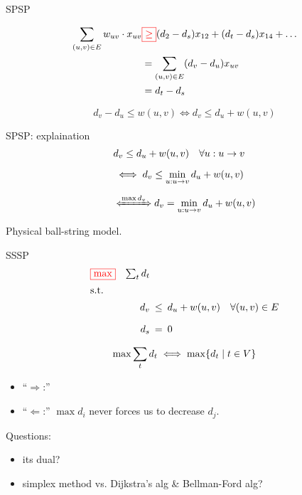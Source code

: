 \begin{frame}{SPSP}
  
  \begin{align*}
	\sum_{(u,v) \in E} w_{uv} \cdot x_{uv} & \textcolor{red}{\boxed{\geq}} (d_2 - d_s) x_{12} + (d_t - d_s) x_{14} + \dots	\\
	&	=	\sum_{(u,v) \in E} (d_v - d_u) x_{uv}	\\
	&	=	d_t - d_s
  \end{align*}

  \[
	d_v - d_u \leq w(u,v) \iff d_v \leq d_u + w(u,v)
  \]
\end{frame}
\begin{frame}{SPSP: explaination}
  \begin{align*}
	&	d_v \leq d_u + w(u,v)	\quad \forall u: u \to v	\\[6pt]
	& 	\iff	d_v \leq \min_{u: u \to v} d_u + w(u,v)	\\[6pt]
	&	\xLeftrightarrow{\max d_v}	d_v = \min_{u: u \to v} d_u + w(u,v)
  \end{align*}

  \vspace{0.50cm}

  \begin{center}
	Physical ball-string model.
  \end{center}
\end{frame}
\begin{frame}{SSSP}
  \begin{equation*}
	\setlength\arraycolsep{2.5pt}
	\begin{array}{l@{\quad}rcl}
	  \color{red}{\boxed{\max}} 	& \sum_{t} d_t	& &	\\[5pt]
	  \text{s.t.} 	& &	\\[5pt]
			& d_v   &\leq& d_u + w(u,v) \quad \forall (u,v) \in E	\\[10pt]
			& d_s	&=& 0 
	\end{array}
  \end{equation*}

  \vspace{0.60cm}

  \[
	\max \sum_{t} d_t \iff \max \{d_t \mid t \in V\}
  \]

  \begin{Proof}
	\begin{itemize}
	  \item ``$\Rightarrow$:''
	  \item ``$\Leftarrow$:'' $\max d_i$ never forces us to decrease $d_j$.
	\end{itemize}
  \end{Proof}

\end{frame}
\begin{frame}
  Questions:
  \begin{itemize}
	\item its dual?
	\item simplex method vs. Dijkstra's alg \& Bellman-Ford alg?
  \end{itemize}
\end{frame}

